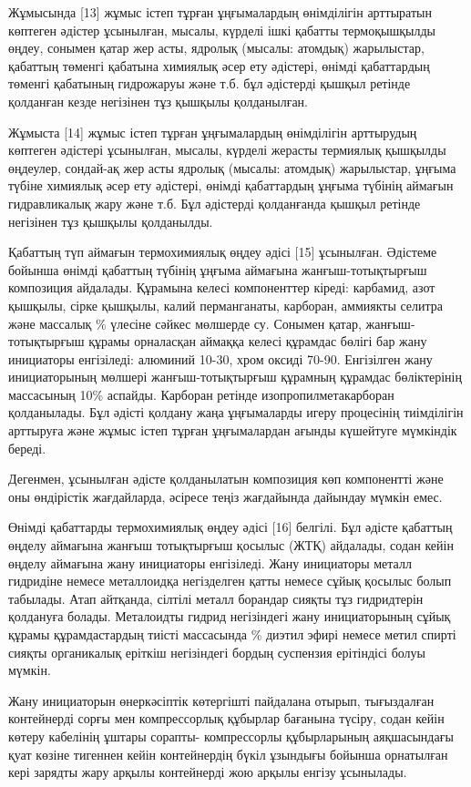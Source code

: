 \begin{multicols}{2}
Жұмысында {[}13{]} жұмыс істеп тұрған ұңғымалардың өнімділігін
арттыратын көптеген әдістер ұсынылған, мысалы, күрделі ішкі қабатты
термоқышқылды өңдеу, сонымен қатар жер асты, ядролық (мысалы: атомдық)
жарылыстар, қабаттың төменгі қабатына химиялық әсер ету әдістері, өнімді
қабаттардың төменгі қабатының гидрожаруы және т.б. бұл әдістерді қышқыл
ретінде қолданған кезде негізінен тұз қышқылы қолданылған.

Жұмыста {[}14{]} жұмыс істеп тұрған ұңғымалардың өнімділігін арттырудың
көптеген әдістері ұсынылған, мысалы, күрделі жерасты термиялық қышқылды
өңдеулер, сондай-ақ жер асты ядролық (мысалы: атомдық) жарылыстар,
ұңғыма түбіне химиялық әсер ету әдістері, өнімді қабаттардың ұңғыма
түбінің аймағын гидравликалық жару және т.б. Бұл әдістерді қолданғанда
қышқыл ретінде негізінен тұз қышқылы қолданылды.

Қабаттың түп аймағын термохимиялық өңдеу әдісі {[}15{]} ұсынылған.
Әдістеме бойынша өнімді қабаттың түбінің ұңғыма аймағына
жанғыш-тотықтырғыш композиция айдалады. Құрамына келесі компоненттер
кіреді: карбамид, азот қышқылы, сірке қышқылы, калий перманганаты,
карборан, аммиякты селитра және массалық \% үлесіне сәйкес мөлшерде су.
Сонымен қатар, жанғыш-тотықтырғыш құрамы орналасқан аймаққа келесі
құрамдас бөлігі бар жану инициаторы енгізіледі: алюминий 10-30, хром
оксиді 70-90. Енгізілген жану инициаторының мөлшері жанғыш-тотықтырғыш
құрамның құрамдас бөліктерінің массасының 10\% аспайды. Карборан ретінде
изопропилметакарборан қолданылады. Бұл әдісті қолдану жаңа ұңғымаларды
игеру процесінің тиімділігін арттыруға және жұмыс істеп тұрған
ұңғымалардан ағынды күшейтуге мүмкіндік береді.

Дегенмен, ұсынылған әдісте қолданылатын композиция көп компонентті және
оны өндірістік жағдайларда, әсіресе теңіз жағдайында дайындау мүмкін
емес.

Өнімді қабаттарды термохимиялық өңдеу әдісі {[}16{]} белгілі. Бұл әдісте
қабаттың өңделу аймағына жанғыш тотықтырғыш қосылыс (ЖТҚ) айдалады,
содан кейін өңделу аймағына жану инициаторы енгізіледі. Жану инициаторы
металл гидридіне немесе металлоидқа негізделген қатты немесе сұйық
қосылыс болып табылады. Атап айтқанда, сілтілі металл борандар сияқты
тұз гидридтерін қолдануға болады. Металоидты гидрид негізіндегі жану
инициаторының сұйық құрамы құрамдастардың тиісті массасында \% диэтил
эфирі немесе метил спирті сияқты органикалық еріткіш негізіндегі бордың
суспензия ерітіндісі болуы мүмкін.

Жану инициаторын өнеркәсіптік көтергішті пайдалана отырып, тығыздалған
контейнерді сорғы мен компрессорлық құбырлар бағанына түсіру, содан
кейін көтеру кабелінің ұштары сорапты- компрессорлы құбырларының
аяқшасындағы қуат көзіне тигеннен кейін контейнердің бүкіл ұзындығы
бойынша орнатылған кері зарядты жару арқылы контейнерді жою арқылы
енгізу ұсынылады.


\end{multicols}
